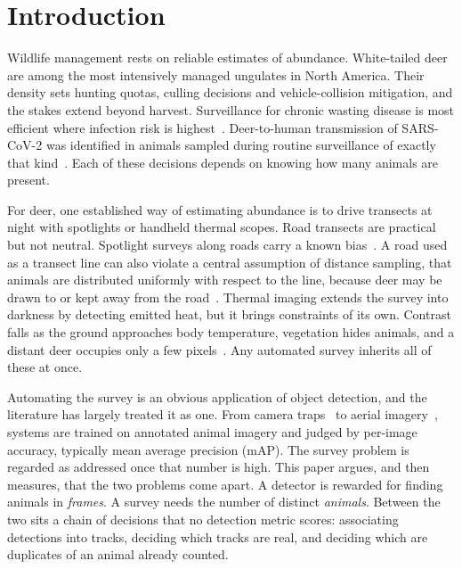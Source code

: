 \section{Introduction}
\label{sec:intro}

Wildlife management rests on reliable estimates of abundance. White-tailed deer are among the
most intensively managed ungulates in North America. Their density sets hunting quotas,
culling decisions and vehicle-collision mitigation, and the stakes extend beyond harvest.
Surveillance for chronic wasting disease is most efficient where infection risk is
highest~\cite{jennelle2018applying}. Deer-to-human transmission of SARS-CoV-2 was identified
in animals sampled during routine surveillance of exactly that
kind~\cite{pickering2022divergent}. Each of these decisions depends on knowing how many
animals are present.

For deer, one established way of estimating abundance is to drive transects at night with
spotlights or handheld thermal scopes. Road transects are practical but not neutral.
Spotlight surveys along roads carry a known bias~\cite{vercauteren2011managing}. A road used
as a transect line can also violate a central assumption of distance sampling, that animals
are distributed uniformly with respect to the line, because deer may be drawn to or kept
away from the road~\cite{diefenbach2025accounting}. Thermal imaging extends the survey into
darkness by detecting emitted heat, but it brings constraints of its own. Contrast falls as
the ground approaches body temperature, vegetation hides animals, and a distant deer
occupies only a few pixels~\cite{burke2019optimizing}. Any automated survey inherits all of
these at once.

Automating the survey is an obvious application of object detection, and the literature has
largely treated it as one. From camera traps~\cite{norouzzadeh2018automatically} to aerial
imagery~\cite{kellenberger2018detecting}, systems are trained on annotated animal imagery
and judged by per-image accuracy, typically mean average precision (mAP). The survey problem
is regarded as addressed once that number is high. This paper argues, and then measures,
that the two problems come apart. A detector is rewarded for finding animals in
\emph{frames}. A survey needs the number of distinct \emph{animals}. Between the two sits a
chain of decisions that no detection metric scores: associating detections into tracks,
deciding which tracks are real, and deciding which are duplicates of an animal already
counted.

